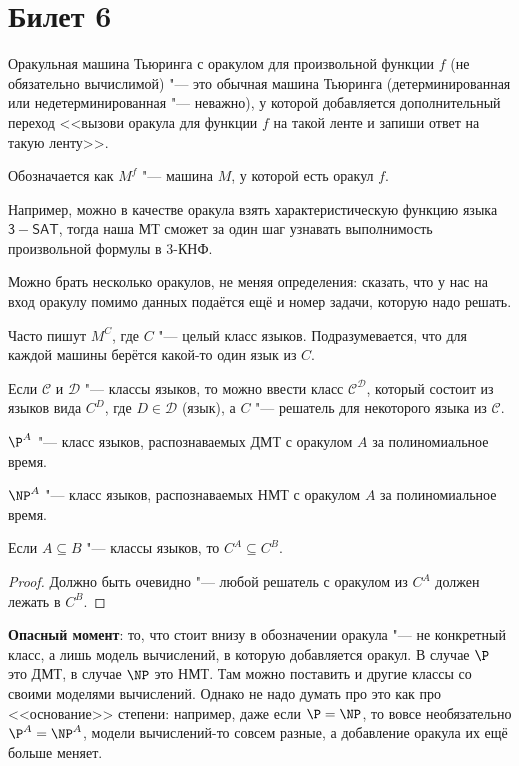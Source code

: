 \setcounter{section}{5}
\section{Билет 6}
	\begin{Def}
		Оракульная машина Тьюринга с оракулом для произвольной функции $f$ (не обязательно вычислимой) "--- это обычная машина Тьюринга (детерминированная или недетерминированная "--- неважно),
		у которой добавляется дополнительный переход <<вызови оракула для функции $f$ на такой ленте и запиши ответ на такую ленту>>.

		Обозначается как $M^f$ "--- машина $M$, у которой есть оракул $f$.
	\end{Def}
	\begin{exmp}
		Например, можно в качестве оракула взять характеристическую функцию языка $\mathsf{3-SAT}$, тогда наша МТ сможет за один шаг узнавать выполнимость
		произвольной формулы в 3-КНФ.
	\end{exmp}
	\begin{Rem}
		Можно брать несколько оракулов, не меняя определения: сказать, что у нас на вход оракулу помимо данных подаётся ещё и номер задачи, которую надо решать.
	\end{Rem}
	\begin{Rem}
		Часто пишут $M^{C}$, где $C$ "--- целый класс языков.
		Подразумевается, что для каждой машины берётся какой-то один язык из $C$.
	\end{Rem}

	\begin{Def}
		Если $\mathcal C$ и $\mathcal D$ "--- классы языков, то можно ввести класс $\mathcal C^{\mathcal D}$, который состоит из языков вида
		$C^D$, где $D \in \mathcal D$ (язык), а $C$ "--- решатель для некоторого языка из $\mathcal C$.
	\end{Def}
	\begin{exmp}
		$\P^A$ "--- класс языков, распознаваемых ДМТ с оракулом $A$ за полиномиальное время.
	\end{exmp}
	\begin{exmp}
		$\NP^A$ "--- класс языков, распознаваемых НМТ с оракулом $A$ за полиномиальное время.
	\end{exmp}
	\begin{assertion}
		Если $A \subseteq B$ "--- классы языков, то $C^{A} \subseteq C^{B}$.
	\end{assertion}
	\begin{proof}
		Должно быть очевидно "--- любой решатель с оракулом из $C^A$ должен лежать в $C^B$.
	\end{proof}
	\begin{Rem}
		\textbf{Опасный момент}: то, что стоит внизу в обозначении оракула "--- не конкретный класс,
		а лишь модель вычислений, в которую добавляется оракул.
		В случае $\P$ это ДМТ, в случае $\NP$ это НМТ.
		Там можно поставить и другие классы со своими моделями вычислений.
		Однако не надо думать про это как про <<основание>> степени: например, даже если $\P=\NP$, то вовсе
		необязательно $\P^A = \NP^A$, модели вычислений-то совсем разные, а добавление оракула их ещё больше меняет.
	\end{Rem}

